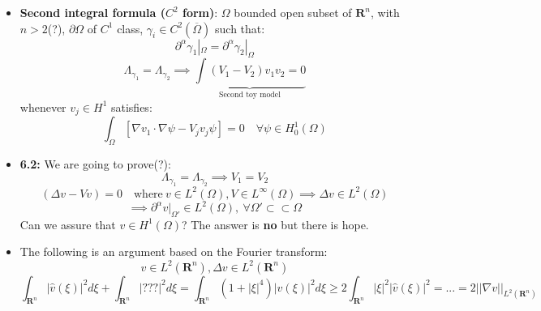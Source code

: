 \documentclass{article}
\begin{document}
\begin{itemize}
    \item \textbf{Second integral formula ($C^2$ form)}: $\Omega$ bounded open subset of $\mathbf{R}^n$, with $n>2$(?), $\partial\Omega$ of $C^1$ class, $\gamma_i \in C^2(\overline{\Omega})$ such that:
    \begin{equation}
        \partial^\alpha \gamma_1 |_\Omega = \partial^\alpha \gamma_2 |_\Omega
    \end{equation}
    \begin{equation}
        \Lambda_{\gamma_1} = \Lambda_{\gamma_2} \implies \underbrace{\int (V_1 - V_2) v_1v_2 = 0}_{\text{Second toy model}}
    \end{equation}
    whenever $v_j \in H^1$ satisfies:
    \begin{equation}
        \int_\Omega [\nabla v_1 \cdot \nabla \psi - V_j v_j \psi] = 0 \quad \forall \psi \in H^1_0(\Omega)
    \end{equation}

    \item \textbf{6.2:} We are going to prove(?):
    \begin{equation}
        \Lambda_{\gamma_1} = \Lambda_{\gamma_2} \implies V_1 = V_2
    \end{equation}
    \begin{equation}
        (\Delta v - Vv) = 0 \quad \text{where} \ v \in L^2(\Omega), V \in L^\infty(\Omega) \implies \Delta v \in L^2(\Omega)
    \end{equation}
    \begin{equation}
        \implies \partial^\alpha v|_{\Omega'} \in L^2(\Omega), \ \forall \Omega' \subset \subset \Omega
    \end{equation}
    Can we assure that $v \in H^1(\Omega)$? The answer is \textbf{no} but there is hope.

    \item The following is an argument based on the Fourier transform:
    \begin{equation}
        v \in L^2(\mathbf{R}^n), \Delta v \in L^2(\mathbf{R}^n)
    \end{equation}
    \begin{equation}
        \int_{\mathbf{R}^n} |\hat{v}(\xi)|^2 d\xi + \int_{\mathbf{R}^n} |???|^2 d\xi =  \int_{\mathbf{R}^n} ( 1 + |\xi|^4) |\hat{v}(\xi)|^2 d\xi \geq 2 \int_{\mathbf{R}^n} |\xi|^2 |\hat{v}(\xi)|^2 = ... = 2 ||\nabla v||_{L^2(\mathbf{R}^n)}
    \end{equation}


\end{itemize}
\end{document}

